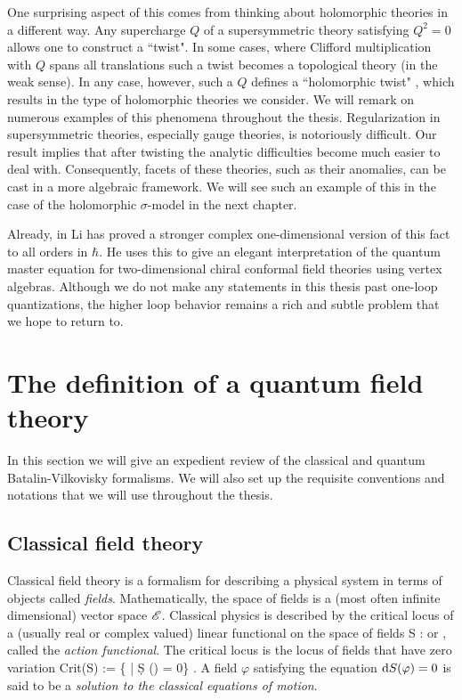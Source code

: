 One surprising aspect of this comes from thinking about holomorphic theories in a different way. 
Any supercharge $Q$ of a supersymmetric theory satisfying $Q^2 = 0$ allows one to construct a ``twist". 
In some cases, where Clifford multiplication with $Q$ spans all translations such a twist becomes a topological theory (in the weak sense). 
In any case, however, such a $Q$ defines a ``holomorphic twist" \cite{CostelloHolomorphic}, which results in the type of holomorphic theories we consider.
We will remark on numerous examples of this phenomena throughout the thesis.
Regularization in supersymmetric theories, especially gauge theories, is notoriously difficult. 
Our result implies that after twisting the analytic difficulties become much easier to deal with. 
Consequently, facets of these theories, such as their anomalies, can be cast in a more algebraic framework.
We will see such an example of this in the case of the holomorphic $\sigma$-model in the next chapter. 

Already, in \cite{LiVertex} Li has proved a stronger complex one-dimensional version of this fact to all orders in $\hbar$. 
He uses this to give an elegant interpretation of the quantum master equation for two-dimensional chiral conformal field theories using vertex algebras.
Although we do not make any statements in this thesis past one-loop
quantizations, the higher loop behavior remains a rich and subtle problem that we hope to return to.

\section{The definition of a quantum field theory}

In this section we will give an expedient review of the classical and quantum Batalin-Vilkovisky formalisms.
We will also set up the requisite conventions and notations that we will use throughout the thesis. 

\subsection{Classical field theory} \label{sec: classical bv}

Classical field theory is a formalism for describing a physical system in terms of objects called {\em fields}. 
Mathematically, the space of fields is a (most often infinite dimensional) vector space $\mathscr E$. 
Classical physics is described by the critical locus of a (usually real or complex valued) linear functional on the space of fields 
\be\label{actionfnl}
S : \sE \to \RR \;\; {\rm or} \;\; \CC,
\ee
called the {\em action functional}. 
The critical locus is the locus of fields that have zero variation
\be
{\rm Crit}(S) := \{\varphi \in \sE \; | \; \d S (\varphi) = 0\} .
\ee
A field $\varphi$ satisfying the equation ${\rm d} S (\varphi) = 0$ is said to be a {\em solution to the classical equations of motion}. 

